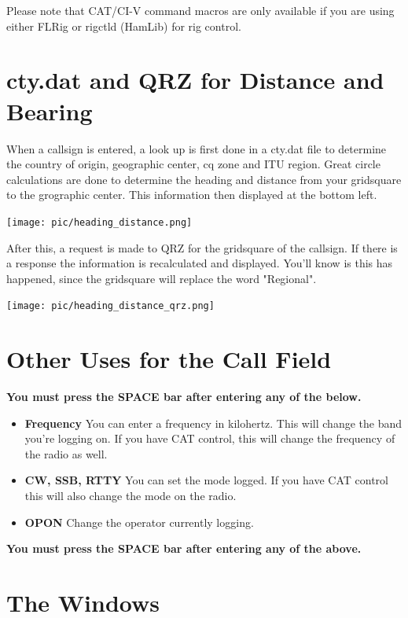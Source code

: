 \documentclass{article}
\begin{document}
Please note that CAT/CI-V command macros are only available if you are using either FLRig or rigctld (HamLib) for rig control.

\newpage
\section{cty.dat and QRZ for Distance and Bearing}

When a callsign is entered, a look up is first done in a cty.dat file to determine the country of origin, geographic center, cq zone and ITU region. Great circle calculations are done to determine the heading and distance from your gridsquare to the grographic center. This information then displayed at the bottom left.

\vspace{0.5cm}
\texttt{[image: pic/heading\_distance.png]}
\vspace{0.5cm}

After this, a request is made to QRZ for the gridsquare of the callsign. If there is a response the information is recalculated and displayed. You'll know is this has happened, since the gridsquare will replace the word "Regional".

\vspace{0.5cm}
\texttt{[image: pic/heading\_distance\_qrz.png]}
\vspace{0.5cm}

\section{Other Uses for the Call Field}

\textbf{You must press the SPACE bar after entering any of the below.}
\begin{itemize}
\item \textbf{Frequency} You can enter a frequency in kilohertz. This will change the band you're logging on. If you have CAT control, this will change the frequency of the radio as well.
\item \textbf{CW, SSB, RTTY} You can set the mode logged. If you have CAT control this will also change the mode on the radio.
\item \textbf{OPON} Change the operator currently logging.
\end{itemize}

\textbf{You must press the SPACE bar after entering any of the above.}

\section{The Windows}
\end{document}
